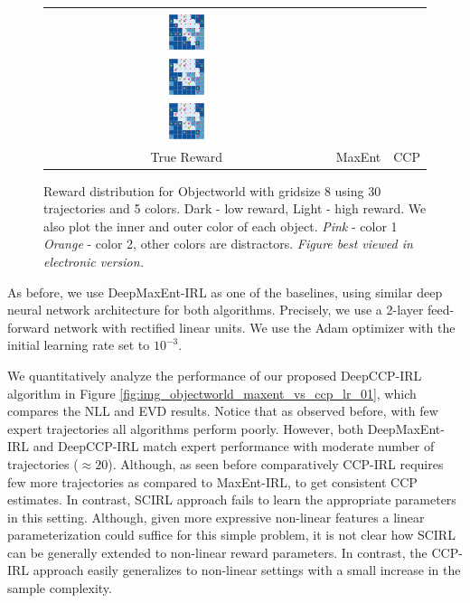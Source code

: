 \documentclass{article}
\def\MSHangBox#1{%
\begin{minipage}[t]{\textwidth}%
\begin{tabbing} %
~\\[-\baselineskip] %
#1 %
\end{tabbing}%
\end{minipage}} %
\begin{document}
\begin{figure}[t]
\centering
  \begin{tabular}{ccc}
    \MSHangBox{\includegraphics[width=0.13\textwidth]{images/objectworld/grid_8_object_20_color_5/reward_map/true_reward_trim.pdf}}&
    \MSHangBox{\includegraphics[width=0.13\textwidth]{images/objectworld/grid_8_object_20_color_5/reward_map/maxent_reward_trim.pdf}}&
    \MSHangBox{\includegraphics[width=0.13\textwidth]{images/objectworld/grid_8_object_20_color_5/reward_map/ccp_reward_trim.pdf}} \\
    True Reward & MaxEnt & CCP \\
    \end{tabular}
    \caption{ Reward distribution for Objectworld with gridsize 8 using 30 trajectories and 5 colors. Dark - low reward, Light - high reward. We also plot the inner and outer color of each object. \textit{Pink} - color 1 \textit{Orange} - color 2, other colors are distractors. \textit{Figure best viewed in electronic version.} }
    \label{fig:img_reward_map_objectworld}
\end{figure}

As before, we use DeepMaxEnt-IRL \cite{wulfmeier2015maximum} as one of the baselines, using similar deep neural network architecture for both algorithms. Precisely, we use a 2-layer feed-forward network with rectified linear units. We use the Adam \cite{kingma2014adam} optimizer with the initial learning rate set to $10^{-3}$.

We quantitatively analyze the performance of our proposed DeepCCP-IRL algorithm in Figure \ref{fig:img_objectworld_maxent_vs_ccp_lr_01}, which compares the NLL and EVD results. Notice that as observed before, with few expert trajectories all algorithms perform poorly. However, both DeepMaxEnt-IRL and DeepCCP-IRL match expert performance with moderate number of trajectories ($\approx 20$). Although, as seen before comparatively CCP-IRL requires few more trajectories as compared to MaxEnt-IRL, to get consistent CCP estimates. In contrast, SCIRL approach fails to learn the appropriate parameters in this setting. Although, given more expressive non-linear features a linear parameterization could suffice for this simple problem, it is not clear how SCIRL can be generally extended to non-linear reward parameters. In contrast, the CCP-IRL approach easily generalizes to non-linear settings with a small increase in the sample complexity.
\end{document}

